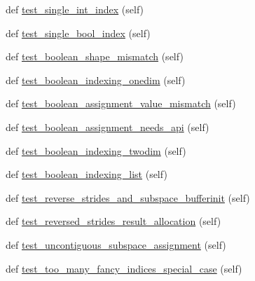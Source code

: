 \begin{DoxyCompactItemize}
\item 
def \hyperlink{classnumpy_1_1core_1_1tests_1_1test__indexing_1_1TestIndexing_a8dddc7abcc3966d0a2de746663172b38}{test\+\_\+single\+\_\+int\+\_\+index} (self)
\item 
def \hyperlink{classnumpy_1_1core_1_1tests_1_1test__indexing_1_1TestIndexing_ad487154c9f802311c07d57c85a891b99}{test\+\_\+single\+\_\+bool\+\_\+index} (self)
\item 
def \hyperlink{classnumpy_1_1core_1_1tests_1_1test__indexing_1_1TestIndexing_ac1f1b9e6bf1361715d0d45ea0610c81c}{test\+\_\+boolean\+\_\+shape\+\_\+mismatch} (self)
\item 
def \hyperlink{classnumpy_1_1core_1_1tests_1_1test__indexing_1_1TestIndexing_a4a6794b3b080ed5f5862fbc5e7a6623d}{test\+\_\+boolean\+\_\+indexing\+\_\+onedim} (self)
\item 
def \hyperlink{classnumpy_1_1core_1_1tests_1_1test__indexing_1_1TestIndexing_ae19a0c022c254e7687757712d89ac5be}{test\+\_\+boolean\+\_\+assignment\+\_\+value\+\_\+mismatch} (self)
\item 
def \hyperlink{classnumpy_1_1core_1_1tests_1_1test__indexing_1_1TestIndexing_aec43115e68a925ebb6eedaeb3897381f}{test\+\_\+boolean\+\_\+assignment\+\_\+needs\+\_\+api} (self)
\item 
def \hyperlink{classnumpy_1_1core_1_1tests_1_1test__indexing_1_1TestIndexing_a68beb3537deccc161007c0504a6c5de0}{test\+\_\+boolean\+\_\+indexing\+\_\+twodim} (self)
\item 
def \hyperlink{classnumpy_1_1core_1_1tests_1_1test__indexing_1_1TestIndexing_aab476a56231a072cb827da5749a77875}{test\+\_\+boolean\+\_\+indexing\+\_\+list} (self)
\item 
def \hyperlink{classnumpy_1_1core_1_1tests_1_1test__indexing_1_1TestIndexing_a971922e51321af38773438ff63fb9a9d}{test\+\_\+reverse\+\_\+strides\+\_\+and\+\_\+subspace\+\_\+bufferinit} (self)
\item 
def \hyperlink{classnumpy_1_1core_1_1tests_1_1test__indexing_1_1TestIndexing_ac55b591fc3da6c34642e5d44c80d05b8}{test\+\_\+reversed\+\_\+strides\+\_\+result\+\_\+allocation} (self)
\item 
def \hyperlink{classnumpy_1_1core_1_1tests_1_1test__indexing_1_1TestIndexing_aaeccf2b26b84f215db8210ae256bac11}{test\+\_\+uncontiguous\+\_\+subspace\+\_\+assignment} (self)
\item 
def \hyperlink{classnumpy_1_1core_1_1tests_1_1test__indexing_1_1TestIndexing_a3c71edc4d03327e72bd1f39bf8377c16}{test\+\_\+too\+\_\+many\+\_\+fancy\+\_\+indices\+\_\+special\+\_\+case} (self)

\end{DoxyCompactItemize}
